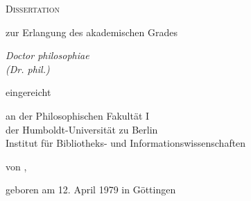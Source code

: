 
\renewcommand{\thepage}{\roman{page}}

\makeatletter

\begin{titlepage}

\begin{center}
\vfill

{\bfseries
  {\huge\strut\ignorespaces\@title\par}
  {\large\strut\ignorespaces\@subtitle\par}
}\vfill

{\huge\textsc{Dissertation}}\par
{\large zur Erlangung des akademischen Grades\par
{}\baselineskip  
{\it Doctor philosophiae\\(Dr. phil.)} \par
{}\baselineskip
eingereicht\par
{}\baselineskip
an der Philosophischen Fakult\"at I\\
der Humboldt-Universität zu Berlin\\
Institut f\"ur Bibliotheks- und Informationswissenschaften\par
{}\baselineskip
von \@author,\par
geboren am 12. April 1979 in G\"ottingen
}
\end{center}

\pagebreak

\thispagestyle{empty}
  \setlength{\parindent}{0pt}
  \setlength{\parskip}{10mm}
  \@uppertitleback

\end{titlepage}

\makeatother
